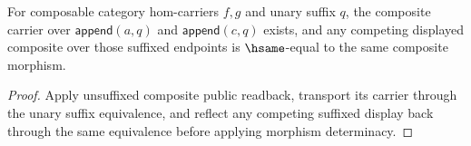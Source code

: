 \begin{theorem}
\label{thm:category-hom-carrier-unary-suffix-comp-public-readback}
For composable category hom-carriers $f,g$ and unary suffix $q$, the composite
carrier over $\mathsf{append}(a,q)$ and $\mathsf{append}(c,q)$ exists, and any
competing displayed composite over those suffixed endpoints is $\hsame$-equal
to the same composite morphism.
\end{theorem}
\begin{proof}
Apply unsuffixed composite public readback, transport its carrier through the
unary suffix equivalence, and reflect any competing suffixed display back
through the same equivalence before applying morphism determinacy.
\end{proof}
